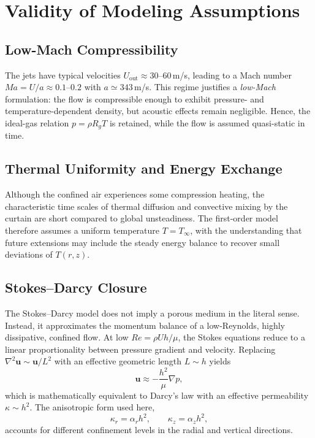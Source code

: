\documentclass[11pt,a4paper]{article}
\begin{document}
\section{Validity of Modeling Assumptions}
\label{sec:validity-of-modeling-assumptions}

\subsection{Low-Mach Compressibility}
The jets have typical velocities $U_{\mathrm{out}}\approx30$--$60\,$m/s, leading to a Mach number $Ma=U/a\approx0.1$--$0.2$ with $a\simeq343\,$m/s.
This regime justifies a \emph{low-Mach} formulation: the flow is compressible enough to exhibit pressure- and temperature-dependent density, but acoustic effects remain negligible.
Hence, the ideal-gas relation $p=\rho R_g T$ is retained, while the flow is assumed quasi-static in time.

\subsection{Thermal Uniformity and Energy Exchange}
Although the confined air experiences some compression heating, the characteristic time scales of thermal diffusion and convective mixing by the curtain are short compared to global unsteadiness.
The first-order model therefore assumes a uniform temperature $T=T_\infty$, with the understanding that future extensions may include the steady energy balance to recover small deviations of $T(r,z)$.

\subsection{Stokes--Darcy Closure}
The Stokes--Darcy model does not imply a porous medium in the literal sense.
Instead, it approximates the momentum balance of a low-Reynolds, highly dissipative, confined flow.
At low $Re=\rho U h/\mu$, the Stokes equations reduce to a linear proportionality between pressure gradient and velocity.
Replacing $\nabla^2\mathbf{u}\sim \mathbf{u}/L^2$ with an effective geometric length $L\sim h$ yields
\begin{equation}
  \mathbf{u}\approx-\frac{h^2}{\mu}\nabla p,
\end{equation}
which is mathematically equivalent to Darcy's law with an effective permeability $\kappa\sim h^2$.
The anisotropic form used here,
\begin{equation}
  \kappa_r=\alpha_r h^2,\qquad \kappa_z=\alpha_z h^2,
\end{equation}
accounts for different confinement levels in the radial and vertical directions.
\end{document}
